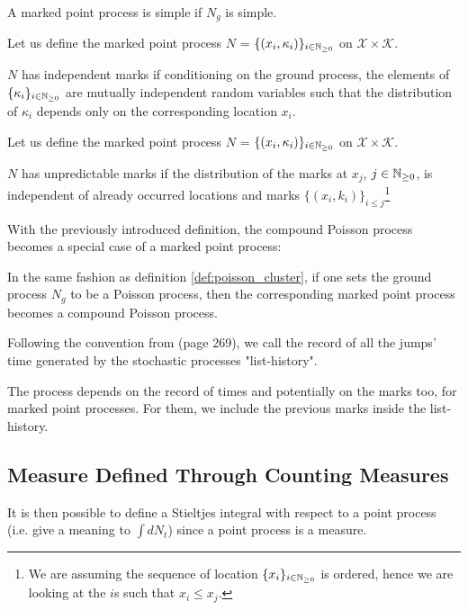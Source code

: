 \begin{definition}
A marked point process is simple if $N_g$ is simple.
\end{definition}

\vspace{0.2 cm }


\begin{definition}
Let us define the marked point process $N$  = $\{  (x_i, \kappa_i)  \}_{ i \in \mathbb{N}_{\geq 0}}$ on $\mathcal X \times \mathcal K$. 

$N$ has independent marks if conditioning on the ground process, the elements of $\{  \kappa_i  \}_{ i \in \mathbb{N}_{\geq 0}}$ are mutually independent random variables such that the distribution of $\kappa_i$  depends only on the corresponding location $x_i$. 
\end{definition}


\begin{definition}
Let us define the marked point process $N$  = $\{  (x_i, \kappa_i)  \}_{ i \in \mathbb{N}_{\geq 0}}$ on $\mathcal X \times \mathcal K$. 

$N$ has unpredictable marks if the distribution of the marks at $x_j$, $j \in \mathbb{N}_{\geq 0}$, is independent of already occurred locations and marks $\{ (x_i, k_i) \}_{i \leq j}$\footnote{We are assuming the sequence of location $\{ x_i \}_{ i \in \mathbb{N}_{\geq 0}}$ is ordered, hence we are looking at the $i$s such that $x_i \leq x_j$.}
\end{definition}


With the previously introduced definition, the compound Poisson process becomes a special case of a marked point process:

\begin{definition}
In the same fashion as definition \ref{def:poisson_cluster}, if one sets the ground process $N_g$ to be a Poisson process, then the corresponding marked point process becomes a compound Poisson process.
\end{definition}



Following the convention from \cite{daley} (page 269), we call the record of all the jumps' time generated by the stochastic processes "list-history". 

The process depends on the record of times and potentially on the marks too, for marked point processes. For them, we include the previous marks inside the list-history.



\subsection{Measure Defined Through Counting Measures}
It is then possible to define a Stieltjes integral with respect to a point process (i.e. give a meaning to $\int dN_t$) since a point process is a measure. 

